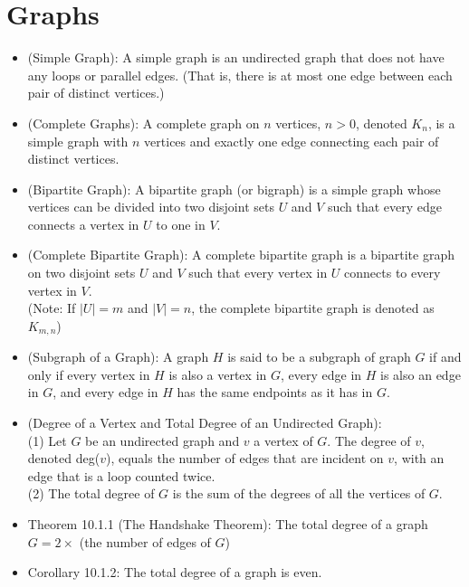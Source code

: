 \documentclass{article}
\begin{document}
\section*{Graphs}
\begin{itemize}
    \item (Simple Graph): A simple graph is an undirected graph that does not have any loops or parallel edges. (That is, there is at most one edge between each pair of distinct vertices.)
    \item (Complete Graphs): A complete graph on $n$ vertices, $n>0$, denoted $K_n$, is a simple graph with $n$ vertices and exactly one edge connecting each pair of distinct vertices.
    \item (Bipartite Graph): A bipartite graph (or bigraph) is a simple graph whose vertices can be divided into two disjoint sets $U$ and $V$ such that every edge connects a vertex in $U$ to one in $V$.
    \item (Complete Bipartite Graph): A complete bipartite graph is a bipartite graph on two disjoint sets $U$ and $V$ such that every vertex in $U$ connects to every vertex in $V$.
        \\ (Note: If $|U|=m$ and $|V|=n$, the complete bipartite graph is denoted as $K_{m,n}$)
    \item (Subgraph of a Graph): A graph $H$ is said to be a subgraph of graph $G$ if and only if every vertex in $H$ is also a vertex in $G$, every edge in $H$ is also an edge in $G$, and every edge in $H$ has the same endpoints as it has in $G$.
    \item (Degree of a Vertex and Total Degree of an Undirected Graph):
        \smallskip    
        \\ \hspace*{3mm} (1) Let $G$ be an undirected graph and $v$ a vertex of $G$. The degree of $v$, denoted deg($v$), equals the number \hspace*{9mm} of edges that are incident on $v$, with an edge that is a loop counted twice.
        \smallskip
        \\ \hspace*{3mm} (2) The total degree of $G$ is the sum of the degrees of all the vertices of $G$.
    \item Theorem 10.1.1 (The Handshake Theorem): The total degree of a graph $G=2\times$ (the number of edges of $G$)
    \item Corollary 10.1.2: The total degree of a graph is even.

\end{itemize}
\end{document}
